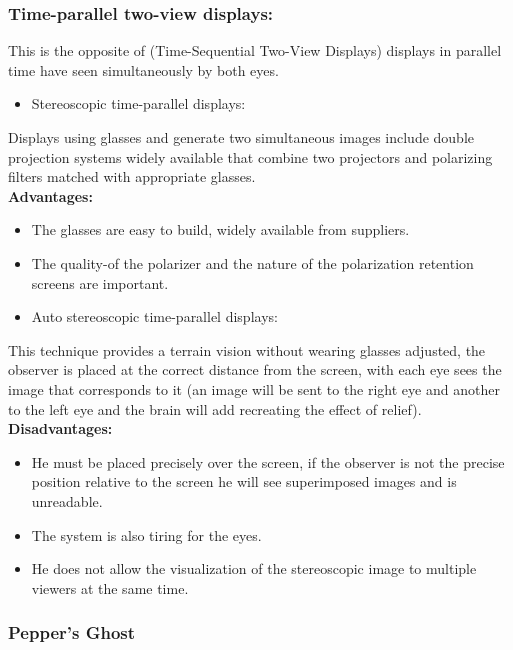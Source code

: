 \subsubsection{Time-parallel two-view displays:}
This is the opposite of (Time-Sequential Two-View Displays) displays in parallel time have seen simultaneously by both eyes.

\begin{itemize}
\item Stereoscopic time-parallel displays:
\end{itemize}
Displays using glasses and generate two simultaneous images include double projection systems widely available that combine two projectors and polarizing filters matched with appropriate glasses.\\
\textbf{Advantages:}
\begin{itemize}
\item The glasses are easy to build, widely available from suppliers.
\item The quality-of the polarizer and the nature of the polarization retention screens are important.
\end{itemize}

\begin{itemize}
\item Auto stereoscopic time-parallel displays:
\end{itemize}
This technique provides a terrain vision without wearing glasses adjusted, the observer is placed at the correct distance from the screen, with each eye sees the image that corresponds to it (an image will be sent to the right eye and another to the left eye and the brain will add recreating the effect of relief).\\
\textbf{Disadvantages:}
\begin{itemize}
\item He must be placed precisely over the screen, if the observer is not the precise position relative to the screen he will see superimposed images and is unreadable.
\item The system is also tiring for the eyes.
\item He does not allow the visualization of the stereoscopic image to multiple viewers at the same time.
\end{itemize}

\subsubsection{Pepper's Ghost}

